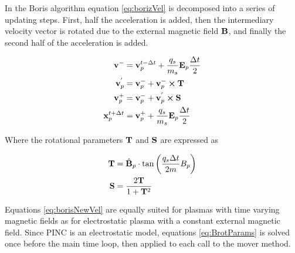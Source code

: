 In the Boris algorithm equation \eqref{eq:borizVel} is decomposed into a series of updating steps. First, half the acceleration is added, then the intermediary velocity vector is rotated due to the external magnetic field $\vb{B}$, and finally the second half of the acceleration is added.

\begin{subequations}\label{eq:borisNewVel}
    \begin{align}
        \vb{v}^{-} &= \vb{v}^{t-\Delta t}_p + \frac{q_s}{m_s} \vb{E}_p \frac{\Delta t}{2} \\
        \vb{v}^{'}_p &= \vb{v}^{-}_p + \vb{v}^{-}_p \cross \vb{T} \\
        \vb{v}^{+}_p &= \vb{v}^{-}_p + \vb{v}^{'}_p \cross \vb{S} \\
        \vb{x}^{t+\Delta t}_p &= \vb{v}^{+}_p + \frac{q_s}{m_s} \vb{E}_p \frac{\Delta t}{2} 
    \end{align}
\end{subequations}

Where the rotational parameters $\vb{T}$ and $\vb{S}$ are expressed as

\begin{subequations}\label{eq:BrotParams}
    \begin{align}
        \vb{T} &= \hat{\vb{B}}_p \cdot \tan\left(\frac{q_s \Delta t}{2m} B_p \right) \\
        \vb{S} &= \frac{2 \vb{T}}{1 + \vb{T}^2} 
    \end{align}
\end{subequations}

Equations \eqref{eq:borisNewVel} are equally suited for plasmas with time varying magnetic fields as for electrostatic plasma with a constant external magnetic field. Since PINC is an electrostatic model, equations \eqref{eq:BrotParams} is solved once before the main time loop, then applied to each call to the mover method.

